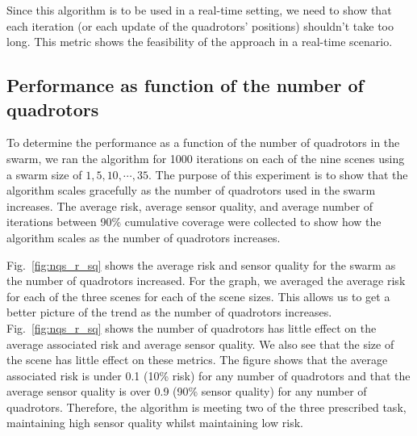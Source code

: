\documentclass{article}
\begin{document}
Since this algorithm is to be used in a real-time setting, we need to show that
each iteration (or each update of the quadrotors' positions) shouldn't take too
long. This metric shows the feasibility of the approach in a real-time
scenario.

\subsection{Performance as function of the number of quadrotors}

To determine the performance as a function of the number of quadrotors in the
swarm, we ran the algorithm for 1000 iterations on each of the nine scenes
using a swarm size of $1, 5, 10, \cdots, 35$. The purpose of this experiment is
to show that the algorithm scales gracefully as the number of quadrotors used
in the swarm increases. The average risk, average sensor quality, and average
number of iterations between 90\% cumulative coverage were collected to show
how the algorithm scales as the number of quadrotors increases.

Fig.~\ref{fig:nqs_r_sq} shows the average risk and sensor quality for the swarm
as the number of quadrotors increased. For the graph, we averaged the average
risk for each of the three scenes for each of the scene sizes. This allows us
to get a better picture of the trend as the number of quadrotors increases.
Fig.~\ref{fig:nqs_r_sq} shows the number of quadrotors has little effect on the
average associated risk and average sensor quality. We also see that the size
of the scene has little effect on these metrics. The figure shows that the
average associated risk is under 0.1 (10\% risk) for any number of quadrotors
and that the average sensor quality is over 0.9 (90\% sensor quality) for any
number of quadrotors. Therefore, the algorithm is meeting two of the three
prescribed task, maintaining high sensor quality whilst maintaining low risk.
\end{document}
